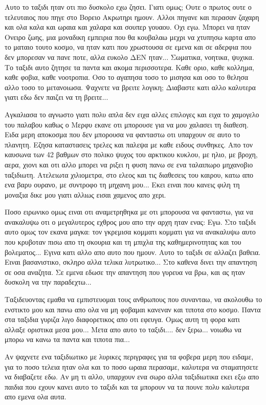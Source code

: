 \documentclass[]{book}
\begin{document}
Αυτο το ταξιδι ηταν οτι πιο δυσκολο εχω ζησει. Γιατι ομως; Ουτε ο πρωτος ουτε ο τελευταιος που πηγε στο Βορειο Ακρωτηρι ημουν.
Αλλοι πηγανε και περασαν ζαχαρη και ολα καλα και ωραια και χαλαρα και σουπερ γουαου.
Οχι εγω. Μπορει να ηταν Ονειρο ζωης, μια μοναδικη εμπειρια που θα κουβαλαω μεχρι να χτυπησω καρτα απο το ματαιο τουτο κοσμο, να ηταν κατι που χρωστουσα σε εμενα και σε αδερφια που δεν μπορεσαν να πανε ποτε, αλλα ευκολο ΔΕΝ ηταν...
Σωματικα, νοητικα, ψυχικα. Το ταξιδι αυτο ζητησε τα παντα και ακομα περισσοτερα. Καθε οριο, καθε κολλημα, καθε φοβια, καθε νοοτροπια. Οσο το αγαπησα τοσο το μισησα και οσο το θελησα αλλο τοσο το μετανοιωσα. Ψαχνετε να βρειτε λογικη; Διαβαστε κατι αλλο καλυτερα γιατι εδω δεν παιζει να τη βρειτε...

Αγκαλιασα το αγνωστο γιατι πολυ απλα δεν ειχα αλλες επιλογες και ειχα το χαμογελο του παλαβου καθως ο Μερφυ εκανε οτι μπορουσε για να μου χαλασει τη διαθεση.
Ειδα μερη αποκοσμα που δεν μπορουσα να φανταστω οτι υπαρχουν σε αυτο το πλανητη.
Εζησα καταστασεις τρελες και παλεψα με καθε ειδους συνθηκες. Απο τον καυσωνα των 42 βαθμων στο πολικο ψυχος του αρκτικου κυκλου, με ηλιο, με βροχη, αερα, χιονι και οτι αλλο μπορει να ριξει η φυση πανω σε ενα ταλαιπωρο μηχανοβιο ταξιδιωτη.
Ατελειωτα χιλιομετρα, στο ελεος και τις διαθεσεις του καιρου, κατω απο ενα βαρυ ουρανο, με συντροφο τη μηχανη μου... Εκει ειναι που κανεις φιλη τη μοναξια δικε μου γιατι αλλιως εισαι χαμενος απο χερι.

Ποσο ειρωνικο ομως ειναι οτι αναμετρηθηκα με οτι μπορουσα να φανταστω, για να ανακαλυψω οτι ο μεγαλυτερος εχθρος μου απο την αρχη ηταν ενας: Εγω.
Στο ταξιδι αυτο ομως τον εκανα μαγκα: τον γκρεμισα κομματι κομματι για να ανακαλυψω αυτο που κρυβοταν πισω απο τη σκουρια και τη μπιχλα της καθημερινοτητας και του βολεματος... Εγινα κατι αλλο απο αυτο που ημουν. Αυτο το ταξιδι σε αλλαζει βαθεια. Ειναι βασανιστικο, σκληρο αλλα τελικα λυτρωτικο...
Στο καθενα δινει την απαντηση σε οσα αναζητα. Σε εμενα εδωσε την απαντηση που γυρευα να βρω, και ας ηταν δυσκολη να την παραδεχτω...

Ταξιδευοντας εμαθα να εμπιστευομαι τους ανθρωπους που συνανταω, να ακολουθω το ενστικτο μου και πανω απο ολα να μη φοβαμαι κανεναν και τιποτα στο κοσμο. Παντα στα ταξιδια γυριζα λιγο διαφορετικος απο οτι εφευγα. 
Ομως αυτη τη φορα κατι αλλαξε οριστικα μεσα μου...
Μετα απο αυτο το ταξιδι.... δεν ξερω... νοιωθω να μπορω να κανω τα παντα και τιποτα πια...

Αν ψαχνετε ενα ταξιδιωτικο με λυρικες περιγραφες για τα φοβερα μερη που ειδαμε, για το ποσο τελεια ηταν ολα και το ποσο ωραια περασαμε, καλυτερα να σταματησετε να διαβαζετε εδω. Αν μη τι αλλο, υπαρχουν ενα σωρο αλλα ταξιδιωτικα εκει εξω απο παιδια που εχουν κανει αυτο το ταξιδι και τα μπορουν να τα πουνε πολυ καλυτερα απο εμενα ολα αυτα.
\end{document}
